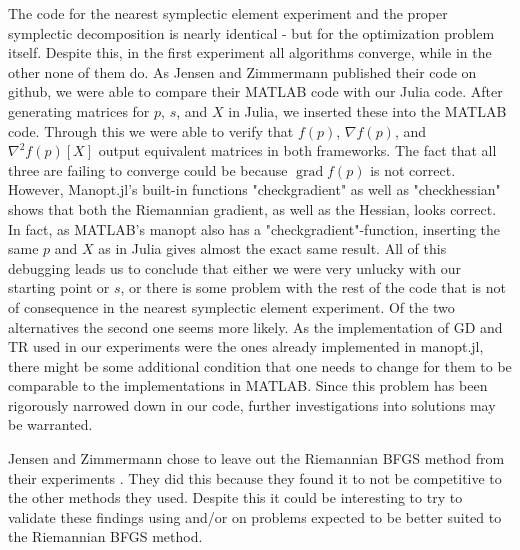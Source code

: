 The code for the nearest symplectic element experiment and the proper symplectic decomposition is nearly identical - but for the optimization problem itself. Despite this, in the first experiment all algorithms converge, while in the other none of them do. As Jensen and Zimmermann published their code on github, we were able to compare their MATLAB code with our Julia code. After generating matrices for $p$, $s$, and $X$ in Julia, we inserted these into the MATLAB code. Through this we were able to verify that $f(p)$, $\nabla f(p)$, and $\nabla^{2}f(p)[X]$ output equivalent matrices in both frameworks. The fact that all three are failing to converge could be because $\operatorname{grad}f(p)$ is not correct. However, Manopt.jl's built-in functions "checkgradient" as well as "checkhessian" shows that both the Riemannian gradient, as well as the Hessian, looks correct. In fact, as MATLAB's manopt also has a "checkgradient"-function, inserting the same $p$ and $X$ as in Julia gives almost the exact same result. All of this debugging leads us to conclude that either we were very unlucky with our starting point or $s$, or there is some problem with the rest of the code that is not of consequence in the nearest symplectic element experiment. Of the two alternatives the second one seems more likely. As the implementation of GD and TR used in our experiments were the ones already implemented in manopt.jl, there might be some additional condition that one needs to change for them to be comparable to the implementations in MATLAB. Since this problem has been rigorously narrowed down in our code, further investigations into solutions may be warranted.

Jensen and Zimmermann chose to leave out the Riemannian BFGS method from their experiments \cite[p.~11]{JensenZimmermann2024}. They did this because they found it to not be competitive to the other methods they used. Despite this it could be interesting to try to validate these findings using  and/or on problems expected to be better suited to the Riemannian BFGS method.